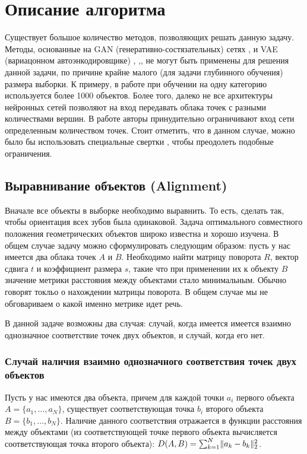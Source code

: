 \section{Описание алгоритма} \label{section:algorithm}

Существует большое количество методов, позволяющих решать данную задачу. Методы, основанные на GAN (генеративно-состязательных) сетях \cite{gan-1},\cite{3d-gan} и VAE (вариацонном автоэнкодировщике) \cite{adversarial-autoencoder}, \cite{3d-autoencoder},\cite{lrgm-cloud}, не могут быть применены для решения данной задачи, по причине крайне малого (для задачи глубинного обучения) размера выборки. К примеру, в работе \cite{lrgm-cloud} при обучении на одну категорию используется более 1000 объектов. Более того, далеко не все архитектуры нейронных сетей позволяют на вход передавать облака точек с разными количествами вершин. В работе \cite{lrgm-cloud} авторы принудительно ограничивают вход сети определенным количеством точек. Стоит отметить, что в данном случае, можно было бы использовать специальные свертки , чтобы преодолеть подобные ограничения. 


\subsection{Выравнивание объектов (Alignment)}

Вначале все объекты в выборке необходимо выравнить. То есть, сделать так, чтобы ориентация всех зубов была одинаковой.
Задача оптимального совместного положения геометрических объектов широко известна и хорошо изучена. В общем случае задачу можно сформулировать следующим образом: пусть у нас имеется два облака точек $A$ и $B$. Необходимо найти матрицу поворота $R$, вектор сдвига $t$ и коэффициент размера $s$, такие что при применении их к объекту $B$ значение метрики расстояния между объектами стало минимальным. Обычно говорят токльо о нахождении матрицы поворота. В общем случае мы не обговариваем о какой именно метрике идет речь.

В данной задаче возможны два случая: случай, когда имеется имеется взаимно однозначное соответствие точек двух объектов, и случай, когда его нет.

\subsubsection{Случай наличия взаимно однозначного соответствия точек двух объектов}
Пусть у нас имеются два объекта, причем для каждой точки $a_{i}$ первого объекта $A = \{a_{1}, \ldots, a_{N}\}$, существует соответствующая точка $b_{i}$ второго объекта $B = \{b_{1}, \ldots, b_{N}\}$. Наличие данного соответствия отражается в функции расстояния между объектами (из соответствующей точке первого объекта вычисляется соответствующая точка второго объекта): $D(A, B) = \sum_{k=1}^{N}  \lVert a_{k} - b_{k}\rVert_{2}^{2}$. 

